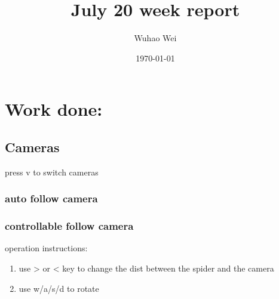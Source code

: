 \documentclass[11pt]{article}
\author{Wuhao Wei}
\date{\today}
\title{July 20 week report}
\begin{document}
\maketitle
\tableofcontents


\section{Work done:}
\label{sec-1}


\subsection{Cameras}
\label{sec-1-1}
press v to switch cameras

\subsubsection{auto follow camera}
\label{sec-1-1-1}

\subsubsection{controllable follow camera}
\label{sec-1-1-2}
operation instructions:
\begin{enumerate}
\item use > or < key to change the dist between the spider and the camera
\item use w/a/s/d to rotate
\end{enumerate}
\end{document}
